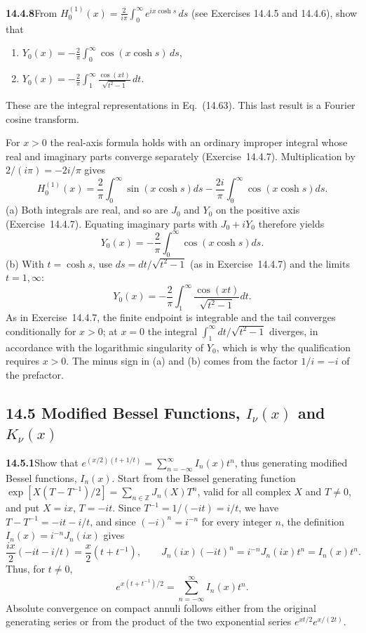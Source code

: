 \par\bigskip
\noindent\textbf{14.4.8}\quad From
$H_{0}^{(1)}(x)=\displaystyle\frac{2}{i\pi}\int_{0}^{\infty}
e^{ix\cosh s}\,ds$ (see Exercises 14.4.5 and 14.4.6), show that
\begin{enumerate}
\item[(a)] $Y_{0}(x)=-\displaystyle\frac{2}{\pi}
\int_{0}^{\infty}\cos(x\cosh s)\,ds$,
\item[(b)] $Y_{0}(x)=-\displaystyle\frac{2}{\pi}
\int_{1}^{\infty}\frac{\cos(xt)}{\sqrt{t^{2}-1}}\,dt$.
\end{enumerate}
These are the integral representations in Eq.~(14.63). This last
result is a Fourier cosine transform.
\par{}
\solution
For $x>0$ the real-axis formula holds with an ordinary improper
integral whose real and imaginary parts converge separately
(Exercise~14.4.7). Multiplication by $2/(i\pi)=-2i/\pi$ gives
\[
H_0^{(1)}(x)=\frac2\pi\int_0^\infty\sin(x\cosh s)ds
-\frac{2i}{\pi}\int_0^\infty\cos(x\cosh s)ds.
\]
(a) Both integrals are real, and so are $J_0$ and $Y_0$ on the
positive axis (Exercise~14.4.7). Equating imaginary parts with
$J_0+iY_0$ therefore yields
\[
\boxed{Y_0(x)=-\frac2\pi\int_0^\infty\cos(x\cosh s)ds}.
\]
(b) With $t=\cosh s$, use $ds=dt/\sqrt{t^2-1}$ (as in
Exercise~14.4.7) and the limits $t=1,\infty$:
\[
\boxed{Y_0(x)=-\frac2\pi\int_1^\infty
\frac{\cos(xt)}{\sqrt{t^2-1}}dt}.
\]
As in Exercise~14.4.7, the finite endpoint is integrable and the
tail converges conditionally for $x>0$; at $x=0$ the integral
$\int_1^\infty dt/\sqrt{t^2-1}$ diverges, in accordance with the
logarithmic singularity of $Y_0$, which is why the qualification
requires $x>0$. The minus sign in (a) and (b) comes from the
factor $1/i=-i$ of the prefactor.

\subsection*{14.5 Modified Bessel Functions, $I_{\nu}(x)$ and $K_{\nu}(x)$}

\par\bigskip
\noindent\textbf{14.5.1}\quad Show that
$e^{(x/2)(t+1/t)}=\displaystyle\sum_{n=-\infty}^{\infty}I_{n}(x)t^{n}$,
thus generating modified Bessel functions, $I_{n}(x)$.
\solution
Start from the Bessel generating function
$\exp[X(T-T^{-1})/2]=\sum_{n\in\mathbb Z}J_n(X)T^n$, valid for all
complex $X$ and $T\ne0$, and put $X=ix$, $T=-it$. Since
$T^{-1}=1/(-it)=i/t$, we have $T-T^{-1}=-it-i/t$, and since
$(-i)^n=i^{-n}$ for every integer $n$, the definition
$I_n(x)=i^{-n}J_n(ix)$ gives
\[
\frac{ix}{2}(-it-i/t)=\frac x2(t+t^{-1}),\qquad
J_n(ix)(-it)^n=i^{-n}J_n(ix)t^n=I_n(x)t^n.
\]
Thus, for $t\ne0$,
\[
\boxed{e^{x(t+t^{-1})/2}=\sum_{n=-\infty}^{\infty}I_n(x)t^n}.
\]
Absolute convergence on compact annuli follows either from the
original generating series or from the product of the two
exponential series $e^{xt/2}e^{x/(2t)}$.

